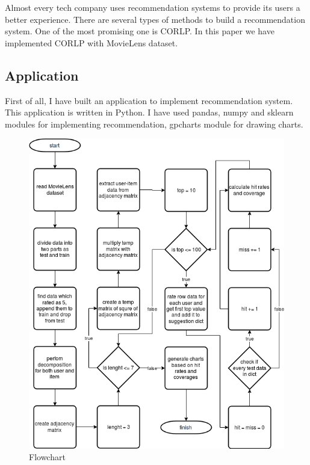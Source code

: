 Almost every tech company uses recommendation systems to provide its users a better experience. There are several types of methods to build a recommendation system. One of the most promising one is \ac{CORLP}. In this paper we have implemented \ac{CORLP} with MovieLens dataset.

\subsection{Application}
First of all, I have built an application to implement recommendation system. This application is written in Python. I have used pandas, numpy and sklearn modules for implementing recommendation, gpcharts module for drawing charts.

\begin{figure}[h!]
   \centering
   \includegraphics[width=1\linewidth]{images/flowchart.png}
   \caption{Flowchart}
   \label{fig:flowchart}
\end{figure}


